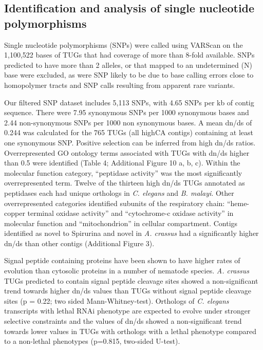 \documentclass[10pt]{bmc_article}
\newenvironment{bmcformat}{\begin{raggedright}\baselineskip20pt\sloppy\setboolean{publ}{false}}{\end{raggedright}\baselineskip20pt\sloppy}
\begin{document}
\begin{bmcformat}
\subsection*{Identification and analysis of single nucleotide
  polymorphisms}

Single nucleotide polymorphisms (SNPs) were called using VARScan
\cite{pmid19542151} on the 1,100,522 bases of TUGs that
had coverage of more than 8-fold available. SNPs predicted to have
more than 2 alleles, or that mapped to an undetermined (N) base were
excluded, as were SNP likely to be due to base calling errors close to
homopolymer tracts and SNP calls resulting from apparent rare
variants. 

Our filtered SNP dataset includes 5,113 SNPs, with 4.65 SNPs per kb of
contig sequence. There were 7.95 synonymous SNPs per 1000 synonymous
bases and 2.44 non-synonymous SNPs per 1000 non synonymous bases. A
mean dn/ds of 0.244 was calculated for the 765 TUGs (all highCA
contigs) containing at least one synonymous SNP. Positive selection
can be inferred from high dn/ds ratios. Overrepresented GO ontology
terms associated with TUGs with dn/ds higher than 0.5 were identified
(Table 4; Additional Figure 10 a, b, c). Within the molecular function
category, ``peptidase activity'' was the most significantly
overrepresented term. Twelve of the thirteen high dn/ds TUGs annotated
as peptidases each had unique orthologs in \textit{C. elegans} and
\textit{B. malayi}. Other overrepresented categories identified
subunits of the respiratory chain: ``heme-copper terminal oxidase
activity'' and ``cytochrome-c oxidase activity'' in molecular function
and ``mitochondrion'' in cellular compartment. Contigs identified as
novel to Spirurina and novel in \textit{A. crassus} had a
significantly higher dn/ds than other contigs (Additional Figure 3).

Signal peptide containing proteins have been shown to have higher
rates of evolution than cytosolic proteins in a number of nematode
species. \textit{A. crassus} TUGs predicted to contain signal peptide
cleavage sites showed a non-significant trend towards higher dn/ds
values than TUGs without signal peptide cleavage sites (p =
0.22; two sided
Mann-Whitney-test). Orthologs of \textit{C. elegans} transcripts with
lethal RNAi phenotype are expected to evolve under stronger selective
constraints and the values of dn/ds showed a non-significant trend
towards lower values in TUGs with orthologs with a lethal phenotype
compared to a non-lethal phenotypes
(p=0.815, two-sided U-test).\\


\end{bmcformat}
\end{document}
